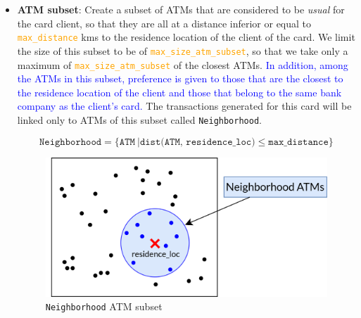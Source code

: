 \documentclass{article}
\begin{document}
\begin{itemize}
    \item \textbf{ATM subset}: Create a subset of ATMs that are considered to be \textit{usual} for 
    the card client, so that they are all at a distance inferior or equal to 
    \textcolor{orange}{\texttt{max\_distance}} kms to the residence location of the client 
    of the card. We limit the size of this subset to be of \textcolor{orange}{\texttt{max\_size\_atm\_subset}}, so that we take only a maximum of \textcolor{orange}{\texttt{max\_size\_atm\_subset}} of the closest ATMs.
    \textcolor{blue}{In addition, among the ATMs in this subset, preference is given to 
    those that are the closest to the residence location of the client and those that 
    belong to the same bank company as the client's card.}
    The transactions generated for this card will be linked only to ATMs of this subset called 
    \texttt{Neighborhood}.

    $$\texttt{Neighborhood} = \{\texttt{ATM}\ | \texttt{dist(ATM, residence\_loc)} \leq \texttt{max\_distance}\}$$

    \begin{figure}[H]
      \centering
      \includegraphics[scale=1.1]{images/tx-generation-1-named.png}
      \caption{\texttt{Neighborhood} ATM subset}
    \end{figure}


\end{itemize}
\end{document}
